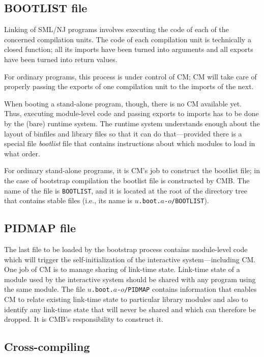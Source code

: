 \subsection{BOOTLIST file}

Linking of SML/NJ programs involves executing the code of each of the
concerned compilation units.  The code of each compilation unit is
technically a closed function; all its imports have been turned into
arguments and all exports have been turned into return values.

For ordinary programs, this process is under control of CM; CM will
take care of properly passing the exports of one compilation unit to
the imports of the next.

When booting a stand-alone program, though, there is no CM available
yet.  Thus, executing module-level code and passing exports to imports
has to be done by the (bare) runtime system.  The runtime system
understands enough about the layout of binfiles and library files so
that it can do that---provided there is a special file {\em bootlist}
file that contains instructions about which modules to load in what
order.

For ordinary stand-alone programs, it is CM's job to construct the
bootlist file; in the case of bootstrap compilation the bootlist file
is constructed by CMB.  The name of the file is {\tt BOOTLIST}, and it
is located at the root of the directory tree that contains stable
files (i.e., its name is {\tt $u$.boot.$a$-$o$/BOOTLIST}).

\subsection{PIDMAP file}

The last file to be loaded by the bootstrap process contains
module-level code which will trigger the self-initialization of the
interactive system---including CM.  One job of CM is to manage sharing
of link-time state.  Link-time state of a module used by the
interactive system should be shared with any program using the same
module.  The file {\tt $u$.boot.$a$-$o$/PIDMAP} contains information
that enables CM to relate existing link-time state to particular
library modules and also to identify any link-time state that will
never be shared and which can therefore be dropped.  It is CMB's
responsibility to construct it.

\subsection{Cross-compiling}

